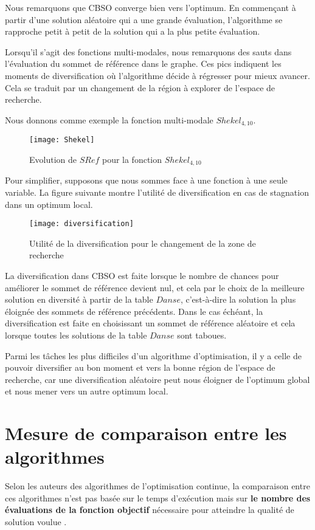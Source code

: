 Nous remarquons que CBSO converge bien vers l'optimum. En commençant à partir d'une solution aléatoire qui a une grande évaluation, l'algorithme se rapproche petit à petit de la solution qui a la plus petite évaluation.

Lorsqu'il s'agit des fonctions multi-modales, nous remarquons des sauts dans l'évaluation du sommet de référence dans le graphe. Ces pics indiquent les moments de diversification où l'algorithme décide à régresser pour mieux avancer. Cela se traduit par un changement de la région à explorer de l'espace de recherche.

Nous donnons comme exemple la fonction multi-modale $Shekel_{4,10}$.\bigskip
\begin{figure}[H]
	\centering
	\texttt{[image: Shekel]}
	\caption{Evolution de $SRef$ pour la fonction $Shekel_{4,10}$}
\end{figure}

Pour simplifier, supposons que nous sommes face à une fonction à une seule variable. La figure suivante montre l'utilité de diversification en cas de stagnation dans un optimum local.

\begin{figure}[H]
	\centering
	\texttt{[image: diversification]}
	\caption{Utilité de la diversification pour le changement de la zone de recherche}
\end{figure}

La diversification dans CBSO est faite lorsque le nombre de chances pour améliorer le sommet de référence devient nul, et cela par le choix de la meilleure solution en diversité à partir de la table $Danse$, c'est-à-dire la solution la plus éloignée des sommets de référence précédents. Dans le cas échéant, la diversification est faite en choisissant un sommet de référence aléatoire et cela lorsque toutes les solutions de la table $Danse$ sont taboues. 

Parmi les tâches les plus difficiles d'un algorithme d'optimisation, il y a celle de pouvoir diversifier au bon moment et vers la bonne région de l'espace de recherche, car une diversification aléatoire peut nous éloigner de l'optimum global et nous mener vers un autre optimum local.

\section{Mesure de comparaison entre les algorithmes}
\begin{spacing}{1.5}
	Selon les auteurs des algorithmes de l'optimisation continue, la comparaison entre ces algorithmes n'est pas basée sur le temps d'exécution mais sur \textbf{le nombre des évaluations de la fonction objectif} nécessaire pour atteindre la qualité de solution voulue \cite{SOCHA_DORIGO_2006}.
\end{spacing}

